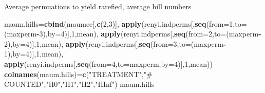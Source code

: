 \documentclass[]{article}
\newenvironment{Shaded}{\begin{snugshade}}{\end{snugshade}}
\newcommand{\KeywordTok}[1]{\textcolor[rgb]{0.13,0.29,0.53}{\textbf{#1}}}
\newcommand{\DataTypeTok}[1]{\textcolor[rgb]{0.13,0.29,0.53}{#1}}
\newcommand{\DecValTok}[1]{\textcolor[rgb]{0.00,0.00,0.81}{#1}}
\newcommand{\StringTok}[1]{\textcolor[rgb]{0.31,0.60,0.02}{#1}}
\newcommand{\OperatorTok}[1]{\textcolor[rgb]{0.81,0.36,0.00}{\textbf{#1}}}
\newcommand{\NormalTok}[1]{#1}
\begin{document}
Average permuations to yield rarefied, average hill numbers

\begin{Shaded}
\begin{Highlighting}[]
\NormalTok{maum.hills=}\KeywordTok{cbind}\NormalTok{(maumee[,}\KeywordTok{c}\NormalTok{(}\DecValTok{2}\NormalTok{,}\DecValTok{3}\NormalTok{)],}
    \KeywordTok{apply}\NormalTok{(renyi.indperms[,}\KeywordTok{seq}\NormalTok{(}\DataTypeTok{from=}\DecValTok{1}\NormalTok{,}\DataTypeTok{to=}\NormalTok{(maxperm}\OperatorTok{-}\DecValTok{3}\NormalTok{),}\DataTypeTok{by=}\DecValTok{4}\NormalTok{)],}\DecValTok{1}\NormalTok{,mean),}
    \KeywordTok{apply}\NormalTok{(renyi.indperms[,}\KeywordTok{seq}\NormalTok{(}\DataTypeTok{from=}\DecValTok{2}\NormalTok{,}\DataTypeTok{to=}\NormalTok{(maxperm}\OperatorTok{-}\DecValTok{2}\NormalTok{),}\DataTypeTok{by=}\DecValTok{4}\NormalTok{)],}\DecValTok{1}\NormalTok{,mean),}
    \KeywordTok{apply}\NormalTok{(renyi.indperms[,}\KeywordTok{seq}\NormalTok{(}\DataTypeTok{from=}\DecValTok{3}\NormalTok{,}\DataTypeTok{to=}\NormalTok{(maxperm}\OperatorTok{-}\DecValTok{1}\NormalTok{),}\DataTypeTok{by=}\DecValTok{4}\NormalTok{)],}\DecValTok{1}\NormalTok{,mean),}
    \KeywordTok{apply}\NormalTok{(renyi.indperms[,}\KeywordTok{seq}\NormalTok{(}\DataTypeTok{from=}\DecValTok{4}\NormalTok{,}\DataTypeTok{to=}\NormalTok{maxperm,}\DataTypeTok{by=}\DecValTok{4}\NormalTok{)],}\DecValTok{1}\NormalTok{,mean))}
\KeywordTok{colnames}\NormalTok{(maum.hills)=}\KeywordTok{c}\NormalTok{(}\StringTok{"TREATMENT"}\NormalTok{,}\StringTok{"# COUNTED"}\NormalTok{,}\StringTok{"H0"}\NormalTok{,}\StringTok{"H1"}\NormalTok{,}\StringTok{"H2"}\NormalTok{,}\StringTok{"HInf"}\NormalTok{)}
\NormalTok{maum.hills}
\end{Highlighting}
\end{Shaded}
\end{document}
